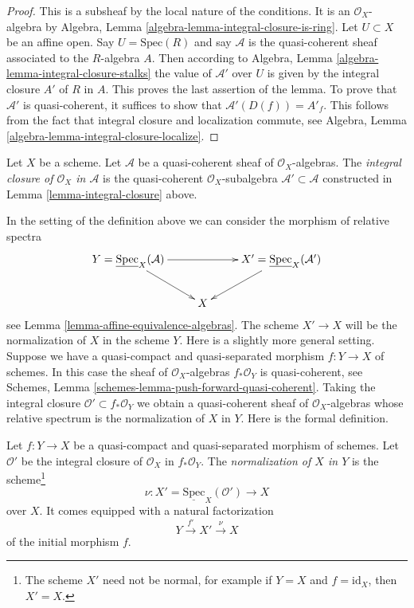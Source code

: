 \begin{proof}
This is a subsheaf by the local nature of the conditions.
It is an $\mathcal{O}_X$-algebra by
Algebra, Lemma \ref{algebra-lemma-integral-closure-is-ring}.
Let $U \subset X$ be an affine open. Say $U = \text{Spec}(R)$
and say $\mathcal{A}$ is the quasi-coherent sheaf associated to
the $R$-algebra $A$. Then according to
Algebra, Lemma \ref{algebra-lemma-integral-closure-stalks}
the value of $\mathcal{A}'$ over $U$ is given by the integral
closure $A'$ of $R$ in $A$. This proves the last assertion of
the lemma. To prove that $\mathcal{A}'$ is quasi-coherent, it
suffices to show that $\mathcal{A}'(D(f)) = A'_f$. This follows
from the fact that integral closure and localization commute, see
Algebra, Lemma \ref{algebra-lemma-integral-closure-localize}.
\end{proof}

\begin{definition}
\label{definition-integral-closure}
Let $X$ be a scheme. Let $\mathcal{A}$ be a quasi-coherent sheaf
of $\mathcal{O}_X$-algebras. The {\it integral closure of $\mathcal{O}_X$
in $\mathcal{A}$} is the quasi-coherent $\mathcal{O}_X$-subalgebra
$\mathcal{A}' \subset \mathcal{A}$ constructed in
Lemma \ref{lemma-integral-closure} above.
\end{definition}

\noindent
In the setting of the definition above we can consider the morphism
of relative spectra
$$
\xymatrix{
Y = \underline{\text{Spec}}_X(\mathcal{A}) \ar[rr] \ar[rd] & &
X' = \underline{\text{Spec}}_X(\mathcal{A}') \ar[ld] \\
& X &
}
$$
see Lemma \ref{lemma-affine-equivalence-algebras}.
The scheme $X' \to X$ will be the normalization of $X$ in the scheme $Y$.
Here is a slightly more general setting. Suppose we have a
quasi-compact and quasi-separated morphism $f : Y \to X$
of schemes. In this case the sheaf of
$\mathcal{O}_X$-algebras $f_*\mathcal{O}_Y$ is quasi-coherent, see
Schemes, Lemma \ref{schemes-lemma-push-forward-quasi-coherent}.
Taking the integral closure $\mathcal{O}' \subset f_*\mathcal{O}_Y$
we obtain a quasi-coherent sheaf of $\mathcal{O}_X$-algebras
whose relative spectrum is the normalization of $X$ in $Y$. Here is
the formal definition.

\begin{definition}
\label{definition-normalization-X-in-Y}
Let $f : Y \to X$ be a quasi-compact and quasi-separated morphism of schemes. 
Let $\mathcal{O}'$ be the integral closure of $\mathcal{O}_X$ in
$f_*\mathcal{O}_Y$. The {\it normalization of $X$ in $Y$} is the
scheme\footnote{The scheme $X'$ need not be normal, for example if
$Y = X$ and $f = \text{id}_X$, then $X' = X$.}
$$
\nu : X' = \underline{\text{Spec}}_X(\mathcal{O}') \to X
$$
over $X$. It comes equipped with a natural factorization
$$
Y \xrightarrow{f'} X' \xrightarrow{\nu} X
$$
of the initial morphism $f$.
\end{definition}

